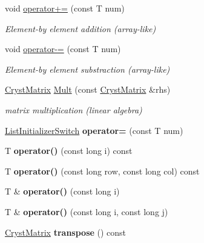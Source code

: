 \begin{DoxyCompactItemize}
\mbox{\label{class_cryst_matrix_ab3ea287ef4232a7623164435426e0060}} 
void \mbox{\hyperlink{class_cryst_matrix_ab3ea287ef4232a7623164435426e0060}{operator+=}} (const T num)
\begin{DoxyCompactList}\small\item\em Element-\/by element addition (array-\/like) \end{DoxyCompactList}\item 
\mbox{\label{class_cryst_matrix_a9cefdbb9ebb808d21a2e2e8949641839}} 
void \mbox{\hyperlink{class_cryst_matrix_a9cefdbb9ebb808d21a2e2e8949641839}{operator-\/=}} (const T num)
\begin{DoxyCompactList}\small\item\em Element-\/by element substraction (array-\/like) \end{DoxyCompactList}\item 
\mbox{\label{class_cryst_matrix_a17d913f4e29567bc06aedf315fb1d12d}} 
\mbox{\hyperlink{class_cryst_matrix}{Cryst\+Matrix}} \mbox{\hyperlink{class_cryst_matrix_a17d913f4e29567bc06aedf315fb1d12d}{Mult}} (const \mbox{\hyperlink{class_cryst_matrix}{Cryst\+Matrix}} \&rhs)
\begin{DoxyCompactList}\small\item\em matrix multiplication (linear algebra) \end{DoxyCompactList}\item 
\mbox{\label{class_cryst_matrix_a91b62f3f5e54ef9318e396ea34e0a151}} 
\mbox{\hyperlink{class_cryst_matrix_1_1_list_initializer_switch}{List\+Initializer\+Switch}} {\bfseries operator=} (const T num)
\item 
\mbox{\label{class_cryst_matrix_a8692d6827bc57a5f5ddc8137ad2056ba}} 
T {\bfseries operator()} (const long i) const
\item 
\mbox{\label{class_cryst_matrix_a6557950b219007b856aa9d2e9aa66a1f}} 
T {\bfseries operator()} (const long row, const long col) const
\item 
\mbox{\label{class_cryst_matrix_a26c655c125f560dfd6f59f3a67cda5ff}} 
T \& {\bfseries operator()} (const long i)
\item 
\mbox{\label{class_cryst_matrix_a78e58dc7f421898ccd1e7815cdf39441}} 
T \& {\bfseries operator()} (const long i, const long j)
\item 
\mbox{\label{class_cryst_matrix_a92de9828cc1ce1596b2496947bc05bdb}} 
\mbox{\hyperlink{class_cryst_matrix}{Cryst\+Matrix}} {\bfseries transpose} () const
\end{DoxyCompactItemize}


